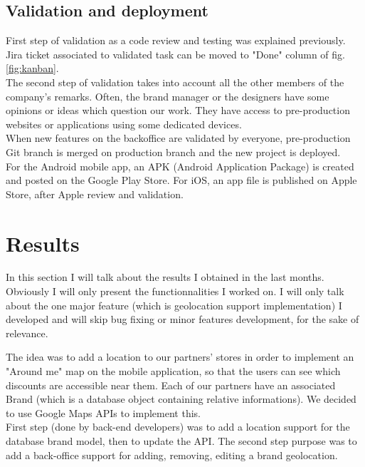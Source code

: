 \documentclass{article}
\begin{document}
            \subsection{Validation and deployment}
                First step of validation as a code review and testing was explained previously. Jira ticket associated to validated task can be
                moved to "Done" column of fig. \ref{fig:kanban}.\\
                The second step of validation takes into account all the other members of the company's remarks. Often, the brand manager
                or the designers have some opinions or ideas which question our work. They have access to pre-production websites or applications
                using some dedicated devices.\\
                When new features on the backoffice are validated by everyone, pre-production Git branch is merged on production branch
                and the new project is deployed.\\
                For the Android mobile app, an APK (Android Application Package) is created and posted on the Google Play Store. For iOS,
                an app file is published on Apple Store, after Apple review and validation.

        \newpage
        \section{Results}

            In this section I will talk about the results I obtained in the last months. Obviously I will only present 
            the functionnalities I worked on. I will only talk about the one major feature (which is geolocation support implementation) I developed 
            and will skip bug fixing or minor features development, for the sake of relevance.

            The idea was to add a location to our partners' stores in
            order to implement an "Around me" map on the mobile application, so that the users can see which discounts are
            accessible near them. Each of our partners have an associated Brand (which is a database object containing relative informations).
            We decided to use Google Maps APIs to implement this.\\

            First step (done by back-end developers) was to add a location support for the database brand model, then to update the API.
            The second step purpose was to add a back-office support for adding, removing, editing a brand geolocation.
\end{document}
